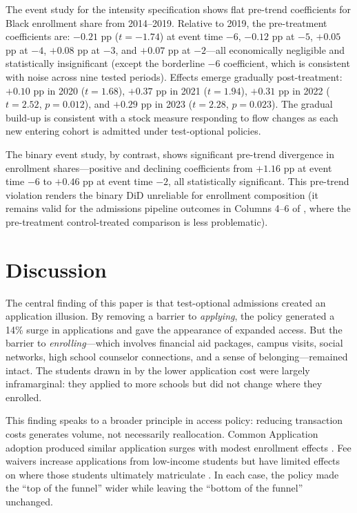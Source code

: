 \documentclass[12pt]{article}
\begin{document}
The event study for the intensity specification shows flat pre-trend coefficients for Black enrollment share from 2014--2019. Relative to 2019, the pre-treatment coefficients are: $-0.21$ pp ($t = -1.74$) at event time $-6$, $-0.12$ pp at $-5$, $+0.05$ pp at $-4$, $+0.08$ pp at $-3$, and $+0.07$ pp at $-2$---all economically negligible and statistically insignificant (except the borderline $-6$ coefficient, which is consistent with noise across nine tested periods). Effects emerge gradually post-treatment: $+0.10$ pp in 2020 ($t = 1.68$), $+0.37$ pp in 2021 ($t = 1.94$), $+0.31$ pp in 2022 ($t = 2.52$, $p = 0.012$), and $+0.29$ pp in 2023 ($t = 2.28$, $p = 0.023$). The gradual build-up is consistent with a stock measure responding to flow changes as each new entering cohort is admitted under test-optional policies.

The binary event study, by contrast, shows significant pre-trend divergence in enrollment shares---positive and declining coefficients from $+1.16$ pp at event time $-6$ to $+0.46$ pp at event time $-2$, all statistically significant. This pre-trend violation renders the binary DiD unreliable for enrollment composition (it remains valid for the admissions pipeline outcomes in Columns 4--6 of , where the pre-treatment control-treated comparison is less problematic).


\section{Discussion}
\label{sec:discussion}

The central finding of this paper is that test-optional admissions created an application illusion. By removing a barrier to \textit{applying}, the policy generated a 14\% surge in applications and gave the appearance of expanded access. But the barrier to \textit{enrolling}---which involves financial aid packages, campus visits, social networks, high school counselor connections, and a sense of belonging---remained intact. The students drawn in by the lower application cost were largely inframarginal: they applied to more schools but did not change where they enrolled.

This finding speaks to a broader principle in access policy: reducing transaction costs generates volume, not necessarily reallocation. Common Application adoption produced similar application surges with modest enrollment effects \citep{Smith2021Unintended}. Fee waivers increase applications from low-income students but have limited effects on where those students ultimately matriculate \citep{Pallais2015Small}. In each case, the policy made the ``top of the funnel'' wider while leaving the ``bottom of the funnel'' unchanged.
\end{document}
